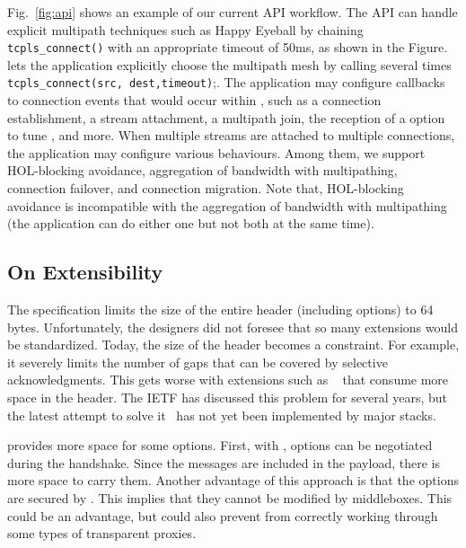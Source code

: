 Fig.~\ref{fig:api} shows an example of our current API workflow. The API can handle explicit multipath techniques such as Happy Eyeball by chaining
\texttt{tcpls\_connect()} with an appropriate timeout of 50ms, as shown in the
Figure. \tcpls lets the application explicitly choose the multipath mesh by calling several times \texttt{tcpls\_connect(src, dest,timeout)};. The application may configure callbacks to connection events that would occur within \tcpls, such as a connection establishment, a stream attachment, a multipath join, the reception of a \tcp option to tune \tcp, and
more. When multiple streams are attached to multiple \tcp connections, the application may configure various \tcpls behaviours. Among them, we support HOL-blocking avoidance, aggregation of bandwidth with multipathing, connection failover, and connection migration. Note that, HOL-blocking avoidance is incompatible with the aggregation of bandwidth with multipathing (the application can do either one but not both at the same time).




\subsection{On \tcp Extensibility}
\label{sec:tcpoptions}

The \tcp specification limits the size of the entire \tcp header (including options) to 64 bytes. Unfortunately, the \tcp designers did not foresee that so many \tcp extensions would be standardized. Today, the size of the \tcp header
becomes a constraint. For example, it severely limits the number of gaps that
can be covered by selective acknowledgments. This gets worse with extensions
such as \mptcp~\cite{rfc6824} that consume more space in the \tcp header.
The IETF has discussed this problem for several years, but the latest attempt
to solve it~\cite{draft-ietf-tcpm-tcp-edo-10} has not yet been implemented by
major \tcp stacks.

\tcpls provides more space for some \tcp options. First, with \tcpls, \tcp
options can be negotiated during the \tls handshake. Since the \tls messages are
included in the \tcp payload, there is more space to carry them. Another
advantage of this approach is that the \tcp options are secured by \tls. This
implies that they cannot be modified by middleboxes. This could be an advantage,
but could also prevent \tcpls from correctly working through some types of
transparent \tcp proxies.

